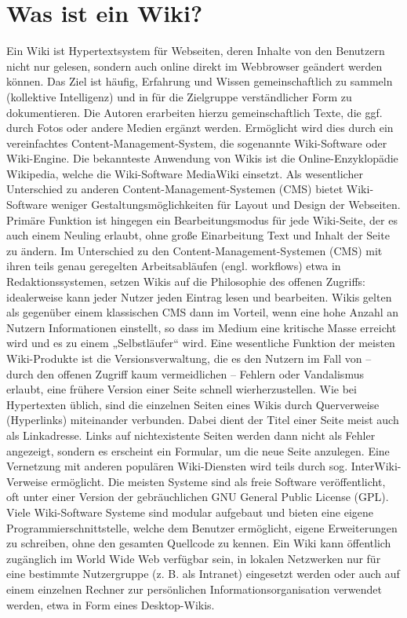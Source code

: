 \section{Was ist ein Wiki?}
Ein Wiki ist Hypertextsystem für Webseiten, deren Inhalte von den Benutzern nicht nur gelesen, sondern auch online direkt im Webbrowser geändert werden können. Das Ziel ist häufig, Erfahrung und Wissen gemeinschaftlich zu sammeln (kollektive Intelligenz) und in für die Zielgruppe verständlicher Form zu dokumentieren. Die Autoren erarbeiten hierzu gemeinschaftlich Texte, die ggf. durch Fotos oder andere Medien ergänzt werden. Ermöglicht wird dies durch ein vereinfachtes Content-Management-System, die sogenannte Wiki-Software oder Wiki-Engine. Die bekannteste Anwendung von Wikis ist die Online-Enzyklopädie Wikipedia, welche die Wiki-Software MediaWiki einsetzt. Als wesentlicher Unterschied zu anderen Content-Management-Systemen (CMS) bietet Wiki-Software weniger Gestaltungsmöglichkeiten für Layout und Design der Webseiten. Primäre Funktion ist hingegen ein Bearbeitungsmodus für jede Wiki-Seite, der es auch einem Neuling erlaubt, ohne große Einarbeitung Text und Inhalt der Seite zu ändern. Im Unterschied zu den Content-Management-Systemen (CMS) mit ihren teils genau geregelten Arbeitsabläufen (engl. workflows) etwa in Redaktionssystemen, setzen Wikis auf die Philosophie des offenen Zugriffs: idealerweise kann jeder Nutzer jeden Eintrag lesen und bearbeiten. Wikis gelten als gegenüber einem klassischen CMS dann im Vorteil, wenn eine hohe Anzahl an Nutzern Informationen einstellt, so dass im Medium eine kritische Masse erreicht wird und es zu einem „Selbstläufer“ wird. Eine wesentliche Funktion der meisten Wiki-Produkte ist die Versionsverwaltung, die es den Nutzern im Fall von – durch den offenen Zugriff kaum vermeidlichen – Fehlern oder Vandalismus erlaubt, eine frühere Version einer Seite schnell wierherzustellen. Wie bei Hypertexten üblich, sind die einzelnen Seiten eines Wikis durch Querverweise (Hyperlinks) miteinander verbunden. Dabei dient der Titel einer Seite meist auch als Linkadresse. Links auf nichtexistente Seiten werden dann nicht als Fehler angezeigt, sondern es erscheint ein Formular, um die neue Seite anzulegen. Eine Vernetzung mit anderen populären Wiki-Diensten wird teils durch sog. InterWiki-Verweise ermöglicht. Die meisten Systeme sind als freie Software veröffentlicht, oft unter einer Version der gebräuchlichen GNU General Public License (GPL). Viele Wiki-Software Systeme sind modular aufgebaut und bieten eine eigene Programmierschnittstelle, welche dem Benutzer ermöglicht, eigene Erweiterungen zu schreiben, ohne den gesamten Quellcode zu kennen. Ein Wiki kann öffentlich zugänglich im World Wide Web verfügbar sein, in lokalen Netzwerken nur für eine bestimmte Nutzergruppe (z. B. als Intranet) eingesetzt werden oder auch auf einem einzelnen Rechner zur persönlichen Informationsorganisation verwendet werden, etwa in Form eines Desktop-Wikis. 
